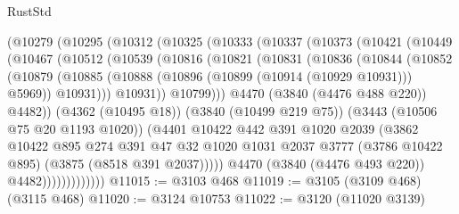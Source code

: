 \begin{lexlean}{RustStd}
\begin{coremodule}
{\begin{coremodule}
{{{{{{{{{{{{{{{{{{{{{{{{{{            (@10279
              (@10295
                (@10312
                  (@10325
                    (@10333
                      (@10337
                        (@10373
                          (@10421
                            (@10449
                              (@10467
                                (@10512
                                  (@10539
                                    (@10816
                                      (@10821
                                        (@10831
                                          (@10836
                                            (@10844
                                              (@10852
                                                (@10879
                                                  (@10885
                                                    (@10888
                                                      (@10896
                                                        (@10899 (@10914 (@10929 @10931)))
                                                        @5969))
                                                    @10931)))
                                              @10931))
                                          @10799)))
                                    @4470
                                    (@3840 (@4476 @488 @220))
                                    @4482))
                                (@4362 (@10495 @18))
                                (@3840 (@10499 @219 @75))
                                (@3443 (@10506 @75 @20 @1193 @1020))
                                (@4401
                                  @10422
                                  @442
                                  @391
                                  @1020
                                  @2039
                                  (@3862
                                    @10422
                                    @895
                                    @274
                                    @391
                                    @47
                                    @32
                                    @1020
                                    @1031
                                    @2037
                                    @3777
                                    (@3786 @10422 @895)
                                    (@3875 (@8518 @391 @2037)))))
                              @4470
                              (@3840 (@4476 @493 @220))
                              @4482)))))))))))))
@11015 := @3103 @468
@11019 := @3105 (@3109 @468) (@3115 @468)
@11020 := @3124 @10753
@11022 := @3120 (@11020 @3139)
}}}}}}}}}}}}}}}}}}}}}}}}}}
\end{coremodule}}
\end{coremodule}
\end{lexlean}
